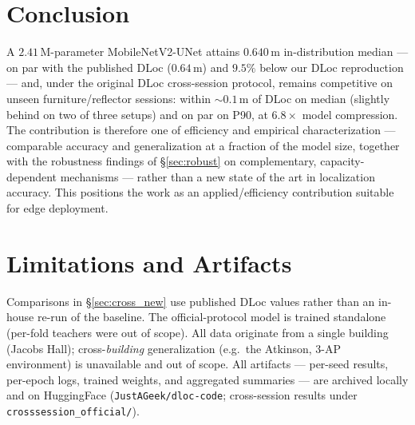 \documentclass[11pt,a4paper]{article}
\begin{document}
\section{Conclusion}

A $2.41$\,M-parameter MobileNetV2-UNet attains $0.640$\,m in-distribution median --- on par with
the published DLoc ($0.64$\,m) and $9.5\%$ below our DLoc reproduction --- and, under the original
DLoc cross-session protocol, remains competitive on unseen furniture/reflector sessions: within
${\sim}0.1$\,m of DLoc on median (slightly behind on two of three setups) and on par on P90, at
$6.8\times$ model compression. The contribution is therefore one of efficiency and empirical
characterization --- comparable accuracy and generalization at a fraction of the model size,
together with the robustness findings of \S\ref{sec:robust} on complementary, capacity-dependent
mechanisms --- rather than a new state of the art in localization accuracy. This positions the
work as an applied/efficiency contribution suitable for edge deployment.

\section{Limitations and Artifacts}

Comparisons in \S\ref{sec:cross_new} use published DLoc values rather than an in-house re-run of
the baseline. The official-protocol model is trained standalone (per-fold teachers were out of
scope). All data originate from a single building (Jacobs Hall); cross-\emph{building}
generalization (e.g.\ the Atkinson, 3-AP environment) is unavailable and out of scope. All
artifacts --- per-seed results, per-epoch logs, trained weights, and aggregated summaries --- are
archived locally and on HuggingFace (\texttt{JustAGeek/dloc-code}; cross-session results under
\texttt{crosssession\_official/}).
\end{document}
